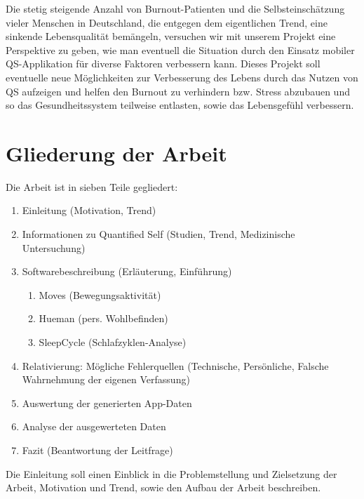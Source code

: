 Die stetig steigende Anzahl von Burnout-Patienten und die Selbsteinschätzung vieler Menschen in Deutschland, die entgegen dem eigentlichen Trend, eine sinkende Lebensqualität bemängeln, versuchen wir mit unserem Projekt eine Perspektive zu geben, wie man eventuell die Situation durch den Einsatz mobiler QS-Applikation für diverse Faktoren verbessern kann. Dieses Projekt soll eventuelle neue Möglichkeiten zur Verbesserung des Lebens durch das Nutzen von QS aufzeigen und helfen den Burnout zu verhindern bzw. Stress abzubauen und so das Gesundheitssystem teilweise entlasten, sowie das Lebensgefühl verbessern. 

\section{Gliederung der Arbeit}
\label{ch:Einleitung:sec:gliederung-der-arbeit}

Die Arbeit ist in sieben Teile gegliedert:

\begin{enumerate}
\def\labelenumi{\arabic{enumi}.}
\itemsep1pt\parskip0pt
\item
  Einleitung (Motivation, Trend)
\item
  Informationen zu Quantified Self (Studien, Trend, Medizinische
  Untersuchung)
\item
  Softwarebeschreibung (Erläuterung, Einführung)

  \begin{enumerate}
  \def\labelenumii{\alph{enumii}.}
  \itemsep1pt\parskip0pt
  \item
    Moves (Bewegungsaktivität)\\
  \item
    Hueman (pers. Wohlbefinden)\\
  \item
    SleepCycle (Schlafzyklen-Analyse)
  \end{enumerate}
\item
  Relativierung: Mögliche Fehlerquellen (Technische, Persönliche,
  Falsche Wahrnehmung der eigenen Verfassung)
\item
  Auswertung der generierten App-Daten
\item
  Analyse der ausgewerteten Daten
\item
  Fazit (Beantwortung der Leitfrage)
\end{enumerate}

Die Einleitung soll einen Einblick in die Problemstellung und
Zielsetzung der Arbeit, Motivation und Trend, sowie den Aufbau der
Arbeit beschreiben.

